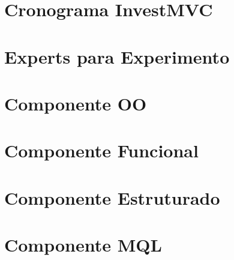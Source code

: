 \begin{apendicesenv}

\partapendices

\chapter{Cronograma InvestMVC}


\chapter{Experts para Experimento}


\chapter{Componente OO}


\chapter{Componente Funcional}


\chapter{Componente Estruturado}


\chapter{Componente MQL}

\end{apendicesenv}